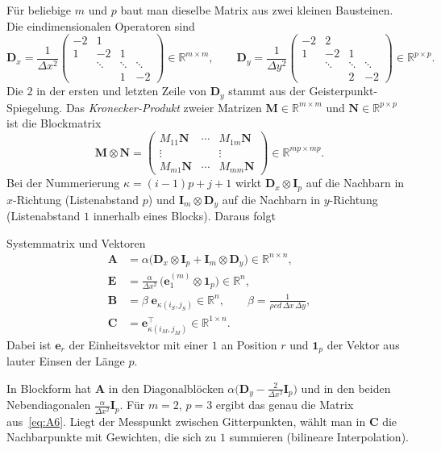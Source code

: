\documentclass[11pt,a4paper]{article}
\numberwithin{equation}{section}
\newcommand{\dx}{\Delta x}
\newcommand{\dy}{\Delta y}
\newcommand{\mA}{\mathbf{A}}
\newcommand{\mB}{\mathbf{B}}
\newcommand{\mE}{\mathbf{E}}
\newcommand{\mC}{\mathbf{C}}
\newcommand{\mI}{\mathbf{I}}
\newcommand{\mDx}{\mathbf{D}_{x}}
\newcommand{\mDy}{\mathbf{D}_{y}}
\newcommand{\ve}{\mathbf{e}}
\newcommand{\vone}{\mathbf{1}}
\newcommand{\Rn}{\mathbb{R}}
\newcommand{\Kron}{\otimes}
\begin{document}
Für beliebige $m$ und $p$ baut man dieselbe Matrix aus zwei kleinen Bausteinen. Die eindimensionalen Operatoren sind
\begin{equation}
 \mDx=\frac{1}{\dx^2}
 \begin{pmatrix}-2&1&&\\1&-2&1&\\&\ddots&\ddots&\ddots\\&&1&-2\end{pmatrix}\in\Rn^{m\times m},\qquad
 \mDy=\frac{1}{\dy^2}
 \begin{pmatrix}-2&2&&\\1&-2&1&\\&\ddots&\ddots&\ddots\\&&2&-2\end{pmatrix}\in\Rn^{p\times p}.
\end{equation}
Die $2$ in der ersten und letzten Zeile von $\mDy$ stammt aus der Geisterpunkt-Spiegelung. Das \emph{Kronecker-Produkt} zweier Matrizen $\mathbf{M}\in\Rn^{m\times m}$ und $\mathbf{N}\in\Rn^{p\times p}$ ist die Blockmatrix
\begin{equation}
 \mathbf{M}\Kron\mathbf{N}=\begin{pmatrix}M_{11}\mathbf{N}&\cdots&M_{1m}\mathbf{N}\\\vdots&&\vdots\\M_{m1}\mathbf{N}&\cdots&M_{mm}\mathbf{N}\end{pmatrix}\in\Rn^{mp\times mp}.
\end{equation}
Bei der Nummerierung $\kappa=(i-1)p+j+1$ wirkt $\mDx\Kron\mI_p$ auf die Nachbarn in $x$-Richtung (Listenabstand $p$) und $\mI_m\Kron\mDy$ auf die Nachbarn in $y$-Richtung (Listenabstand $1$ innerhalb eines Blocks). Daraus folgt
\begin{ergebnis}{Systemmatrix und Vektoren}
\begin{align}
 \mA&=\alpha\bigl(\mDx\Kron\mI_p+\mI_m\Kron\mDy\bigr)\in\Rn^{n\times n},\\
 \mE&=\frac{\alpha}{\dx^2}\,\bigl(\ve_1^{(m)}\Kron\vone_p\bigr)\in\Rn^{n},\\
 \mB&=\beta\;\ve_{\kappa(i_S,j_S)}\in\Rn^{n},\qquad \beta=\frac{1}{\rho c d\,\dx\,\dy},\\
 \mC&=\ve_{\kappa(i_M,j_M)}^{\top}\in\Rn^{1\times n}.
\end{align}
Dabei ist $\ve_r$ der Einheitsvektor mit einer $1$ an Position $r$ und $\vone_p$ der Vektor aus lauter Einsen der Länge $p$.
\end{ergebnis}
In Blockform hat $\mA$ in den Diagonalblöcken $\alpha\bigl(\mDy-\tfrac{2}{\dx^2}\mI_p\bigr)$ und in den beiden Nebendiagonalen $\tfrac{\alpha}{\dx^2}\mI_p$. Für $m=2$, $p=3$ ergibt das genau die Matrix aus~\eqref{eq:A6}. Liegt der Messpunkt zwischen Gitterpunkten, wählt man in $\mC$ die Nachbarpunkte mit Gewichten, die sich zu $1$ summieren (bilineare Interpolation).
\end{document}

